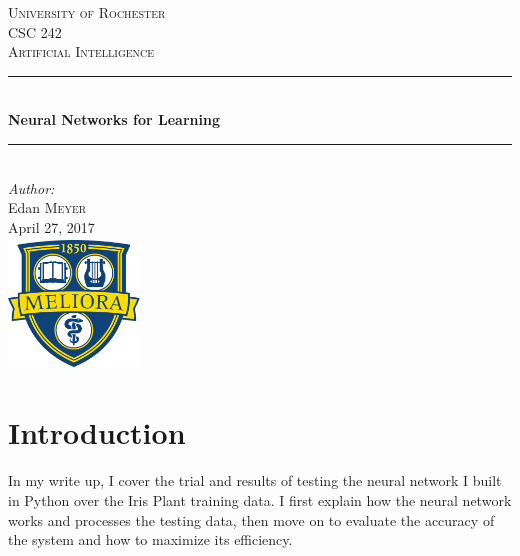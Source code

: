 \documentclass[12pt]{article}
\begin{document}
\begin{titlepage}

\newcommand{\HRule}{\rule{\linewidth}{0.5mm}} %

\center %

\textsc{\LARGE University of Rochester}\\[1.5cm] %
\textsc{\Large CSC 242}\\[0.5cm] %
\textsc{\large Artificial Intelligence}\\[0.5cm] %

\HRule \\[0.4cm]
{ \huge \bfseries Neural Networks for Learning}\\[0.4cm] %
\HRule \\[1.5cm]

\Large \emph{Author:}\\
Edan \textsc{Meyer}\\[2cm] %

{\large April 27, 2017}\\[2cm] %

\includegraphics[width=3.5cm,height=3.5cm,keepaspectratio]{img/logo.png}\\[1cm] %

\vfill %

\end{titlepage}

\section{Introduction}

In my write up, I cover the trial and results of testing the neural network I built in Python over the
Iris Plant training data. I first explain how the neural network works and processes the testing data, then move on to evaluate the accuracy of the system and how to maximize its efficiency.
\end{document}
